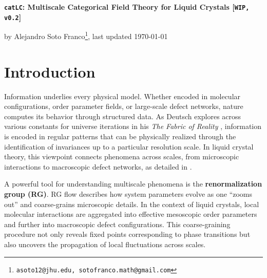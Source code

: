

	
	\begin{center}
		\begin{huge}
			{\textbf{\texttt{catLC}: Multiscale Categorical Field Theory for Liquid Crystals [\texttt{WIP, v0.2}]}}\\[2ex]
		\end{huge}
		
		\begin{Large}
			by Alejandro Soto Franco\footnote{\texttt{asoto12@jhu.edu, sotofranco.math@gmail.com}}, last updated \today
		\end{Large}
	\end{center}
	
	\thispagestyle{empty}
	
	\tableofcontents
	
	\newpage
	
	\section{Introduction}
	
	Information underlies every physical model. Whether encoded in molecular configurations, order parameter fields, or large-scale defect networks, nature computes its behavior through structured data. As Deutsch explores across various constants for universe iterations in his \emph{The Fabric of Reality} \cite{deutsch1997fabric}, information is encoded in regular patterns that can be physically realized through the identification of invariances up to a particular resolution scale. In liquid crystal theory, this viewpoint connects phenomena across scales, from microscopic interactions to macroscopic defect networks, as detailed in \cite{degennes1993physics, cardy1996scaling, ma1976modern}.
	
	A powerful tool for understanding multiscale phenomena is the \textbf{renormalization group (RG)}. RG flow describes how system parameters evolve as one “zooms out” and coarse-grains microscopic details. In the context of liquid crystals, local molecular interactions are aggregated into effective mesoscopic order parameters and further into macroscopic defect configurations. This coarse-graining procedure not only reveals fixed points corresponding to phase transitions but also uncovers the propagation of local fluctuations across scales.
	

